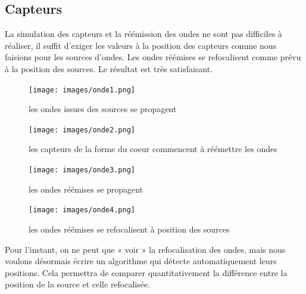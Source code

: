 \documentclass[11pt, a4paper]{article}
\begin{document}
\subsection{Capteurs}
La simulation des capteurs et la réémission des ondes ne sont pas difficiles à réaliser, il suffit d'exiger les valeurs à la position des capteurs comme nous faisions pour les sources d'ondes. Les ondes réémises se refocalisent comme prévu à la position des sources. Le résultat est très satisfaisant.

\begin{figure}[htbp]
    \centering
    \begin{minipage}[t]{0.48\textwidth}
        \centering
        \texttt{[image: images/onde1.png]}
        \caption{les ondes issues des sources se propagent}
        \label{onde1}
    \end{minipage}
    \hfill
    \begin{minipage}[t]{0.48\textwidth}
        \centering
        \texttt{[image: images/onde2.png]}
        \caption{les capteurs de la forme du coeur commencent à réémettre les ondes}
        \label{onde2}
    \end{minipage}
    \hfill
    \begin{minipage}[t]{0.48\textwidth}
        \centering
        \texttt{[image: images/onde3.png]}
        \caption{les ondes réémises se propagent}
        \label{onde3}
    \end{minipage}
    \hfill
    \begin{minipage}[t]{0.48\textwidth}
        \centering
        \texttt{[image: images/onde4.png]}
        \caption{les ondes réémises se refocalisent à position des sources}
        \label{onde4}
    \end{minipage}
\end{figure}

Pour l'instant, on ne peut que « voir » la refocalisation des ondes, mais nous voulons désormais écrire un algorithme qui détecte automatiquement leurs positions. Cela permettra de comparer quantitativement la différence entre la position de la source et celle refocalisée.
\end{document}
